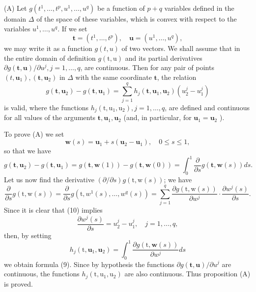 \documentclass[10pt,a5paper]{book}
\makeatletter
\theoremstyle{plain}
\theoremstyle{definition}
\theoremstyle{remark}
\renewenvironment{proof}[1][\proofname]{\par
  \pushQED{\qed}%
  \normalfont\topsep6\p@\@plus6\p@\relax
  \trivlist
  \item\relax{\itshape #1\@addpunct{.}}\hspace\labelsep\ignorespaces
}{\popQED\endtrivlist\@endpefalse}
\makeatother
\begin{document}
\begin{proof}
(A) Let $g\left(t^{1}, \ldots, t^{p}, u^{1}, \ldots, u^{q}\right)$ be a function of $p+q$ variables defined in the domain $\Delta$ of the space of these variables, which is convex with respect to the variables $u^{1}, \ldots, u^{q}$. If we set
\[
\mathbf{t}=\left(t^{1}, \ldots, t^{p}\right), \quad \mathbf{u}=\left(u^{1}, \ldots, u^{q}\right),
\]
we may write it as a function $g(t, u)$ of two vectors. We shall assume that in the entire domain of definition $g(\mathrm{t}, \mathrm{u})$ and its partial derivatives $\partial g(\mathbf{t}, \mathbf{u}) / \partial u^{j}, j=1, \ldots, q$, are continuous. Then for any pair of points $\left(t, \mathbf{u}_{1}\right),\left(\mathbf{t}, \mathbf{u}_{2}\right)$ in $\Delta$ with the same coordinate $\mathbf{t}$, the relation
\begin{equation*}
g\left(\mathbf{t}, \mathbf{u}_{2}\right)-g\left(\mathbf{t}, \mathbf{u}_{1}\right)=\sum_{j=1}^{q} h_{j}\left(\mathbf{t}, \mathbf{u}_{1}, \mathbf{u}_{2}\right)\left(u_{2}^{j}-u_{1}^{j}\right) \tag{9}
\end{equation*}
is valid, where the functions $h_{j}\left(\mathrm{t}, \mathrm{u}_{1}, \mathrm{u}_{2}\right), j=1, \ldots, q$, are defined and continuous for all values of the arguments $\mathbf{t}, \mathbf{u}_{1}, \mathbf{u}_{2}$ (and, in particular, for $\mathbf{u}_{1}=\mathbf{u}_{2}$ ).

To prove (A) we set
\begin{equation*}
\mathbf{w}(s)=\mathbf{u}_{1}+s\left(\mathbf{u}_{2}-\mathbf{u}_{1}\right), \quad 0 \leq s \leq 1, \tag{10}
\end{equation*}
so that we have
\[
g\left(\mathbf{t}, \mathbf{u}_{2}\right)-g\left(\mathbf{t}, \mathbf{u}_{1}\right)=g(\mathbf{t}, \mathbf{w}(1))-g(\mathbf{t}, \mathbf{w}(0))=\int_{0}^{1} \frac{\partial}{\partial s} g(\mathbf{t}, \mathbf{w}(s)) d s .
\]
Let us now find the derivative $(\partial / \partial s) g(\mathrm{t}, \mathrm{w}(s))$; we have
\[
\frac{\partial}{\partial s} g(\mathrm{t}, \mathrm{w}(s))=\frac{\partial}{\partial s} g\left(\mathrm{t}, w^{1}(s), \ldots, w^{q}(s)\right)=\sum_{j=1}^{q} \frac{\partial g(\mathrm{t}, \mathrm{w}(s))}{\partial w^{j}} \cdot \frac{\partial w^{j}(s)}{\partial s} .
\]
Since it is clear that (10) implies
\[
\frac{\partial w^{j}(s)}{\partial s}=u_{2}^{j}-u_{1}^{j}, \quad j=1, \ldots, q,
\]
then, by setting
\[
h_{j}\left(\mathrm{t}, \mathbf{u}_{1}, \mathbf{u}_{2}\right)=\int_{0}^{1} \frac{\partial g(\mathrm{t}, \mathbf{w}(s))}{\partial w^{j}} d s
\]
we obtain formula (9). Since by hypothesis the functions $\partial g(\mathbf{t}, \mathbf{u}) / \partial u^{j}$ are continuous, the functions $h_{j}\left(\mathrm{t}, \mathrm{u}_{1}, \mathrm{u}_{2}\right)$ are also continuous. Thus proposition (A) is proved.
\end{proof}
\end{document}
